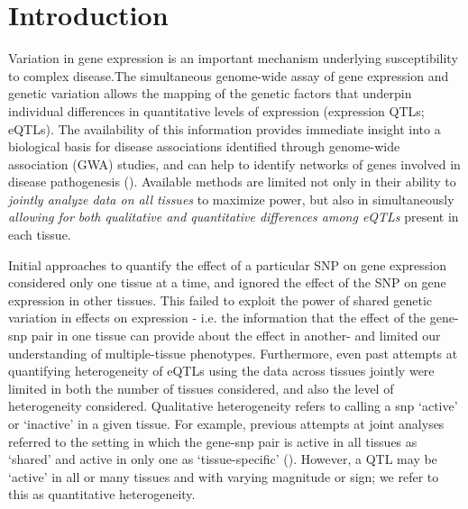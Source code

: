 \section*{Introduction}
Variation in gene expression is an important mechanism underlying susceptibility to complex disease.The simultaneous genome-wide assay of gene expression and genetic variation allows the mapping of the genetic factors that underpin individual differences in quantitative levels of expression (expression QTLs; eQTLs). 
The availability of this information provides immediate insight into a biological basis for disease associations identified through genome-wide association (GWA) studies, and can help to identify networks of genes 
involved in disease pathogenesis (\cite{nicolae_trait-associated_2010, veyrieras_high-resolution_2008}).
Available methods are limited not only in their ability to {\it jointly analyze data on all tissues} to maximize power, but also in simultaneously {\it allowing for both qualitative and quantitative differences among eQTLs} present in each tissue.

Initial approaches to quantify the effect of a particular SNP on gene expression considered only one tissue at a time, and ignored the effect of the SNP on gene expression in other tissues.
This failed to exploit the power of shared genetic variation in effects on expression - i.e. the information that the effect of the gene-snp pair in one tissue can provide about the effect in another- and limited our understanding of multiple-tissue phenotypes.
Furthermore, even past attempts at quantifying heterogeneity of eQTLs using the data across tissues jointly were limited in both the number of tissues considered, and also the level of heterogeneity considered. Qualitative heterogeneity refers to calling a snp `active' or `inactive' in a given tissue. For example, previous attempts at joint analyses referred to the setting in which the gene-snp pair is active in all tissues as `shared' and active in only one as `tissue-specific'  (\cite{flutre_statistical_2013,wen_bayesian_2014}).
However, a QTL may be `active' in all or many tissues and with varying magnitude or sign; we refer to this as quantitative heterogeneity.

